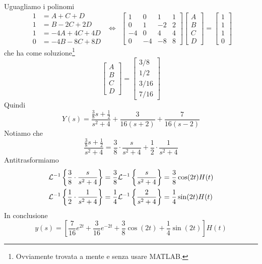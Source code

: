 Uguagliamo i polinomi
\begin{equation*}
\begin{aligned}
1 & = A + C + D\\
1 & = B - 2C + 2D\\
1 & = - 4A + 4C + 4D\\
0 & = - 4B - 8C + 8D
\end{aligned} \ \ \iff \ \ \begin{bmatrix}
1 & 0 & 1 & 1\\
0 & 1 & - 2 & 2\\
- 4 & 0 & 4 & 4\\
0 & - 4 & - 8 & 8
\end{bmatrix}\begin{bmatrix}
A\\
B\\
C\\
D
\end{bmatrix} = \begin{bmatrix}
1\\
1\\
1\\
0
\end{bmatrix}
\end{equation*}
che ha come soluzione\footnote{Ovviamente trovata a mente e senza usare MATLAB.}
\begin{equation*}
\begin{bmatrix}
A\\
B\\
C\\
D
\end{bmatrix} = \begin{bmatrix}
3/8\\
1/2\\
3/16\\
7/16
\end{bmatrix}
\end{equation*}
Quindi
\begin{equation*}
Y(s) = \frac{\frac{3}{8} s + \frac{1}{2}}{s^{2} + 4} + \frac{3}{16(s + 2)} + \frac{7}{16(s - 2)}
\end{equation*}
Notiamo che
\begin{equation*}
\frac{\frac{3}{8} s + \frac{1}{2}}{s^{2} + 4} = \frac{3}{8} \cdot \frac{s}{s^{2} + 4} + \frac{1}{2} \cdot \frac{1}{s^{2} + 4}
\end{equation*}
Antitrasformiamo
\begin{align*}
\mathcal{L}^{ - 1}\left\{\frac{3}{8} \cdot \frac{s}{s^{2} + 4}\right\} & = \frac{3}{8}\mathcal{L}^{ - 1}\left\{\frac{s}{s^{2} + 4}\right\} = \frac{3}{8}\cos(2t) H(t)\\
\mathcal{L}^{ - 1}\left\{\frac{1}{2} \cdot \frac{1}{s^{2} + 4}\right\} & = \frac{1}{4}\mathcal{L}^{ - 1}\left\{\frac{2}{s^{2} + 4}\right\} = \frac{1}{4}\sin(2t) H(t)
\end{align*}
In conclusione
\begin{equation*}
y(s) = \left[\frac{7}{16} e^{2t} + \frac{3}{16} e^{ - 2t} + \frac{3}{8}\cos(2t) + \frac{1}{4}\sin(2t)\right] H(t)
\end{equation*}

